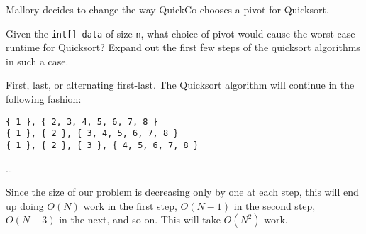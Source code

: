\begin{blocksection}
\question Mallory decides to change the way QuickCo chooses a pivot for
Quicksort.

Given the \lstinline$int[] data$ of size \lstinline$n$, what choice of pivot
would cause the worst-case runtime for Quicksort? Expand out the first few
steps of the quicksort algorithms in such a case.

\begin{solution}[1in]
First, last, or alternating first-last. The Quicksort algorithm will continue
in the following fashion:

\begin{verbatim}
{ 1 }, { 2, 3, 4, 5, 6, 7, 8 }
{ 1 }, { 2 }, { 3, 4, 5, 6, 7, 8 }
{ 1 }, { 2 }, { 3 }, { 4, 5, 6, 7, 8 }
\end{verbatim}
\ldots

Since the size of our problem is decreasing only by one at each step, this will
end up doing $O(N)$ work in the first step, $O(N-1)$ in the second step,
$O(N-3)$ in the next, and so on. This will take $O(N^2)$ work.
\end{solution}
\end{blocksection}
